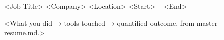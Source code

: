 
\begin{cventries}

  \cventry
    {<Job Title>}
    {<Company>}
    {<Location>}
    {<Start> -- <End>}
    {
      \begin{cvitems}
        \item {<What you did → tools touched → quantified outcome, from master-resume.md.>}
      \end{cvitems}
    }

\end{cventries}
